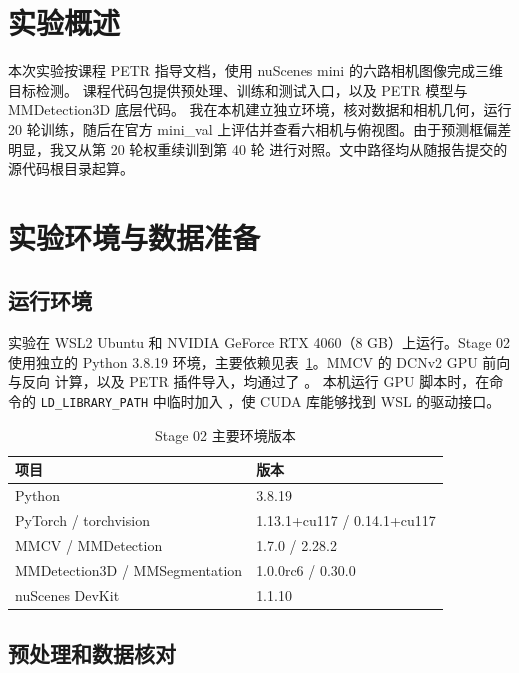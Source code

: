 \documentclass[UTF8,zihao=5,scheme=chinese]{ctexart}
\begin{document}
\makecoursecover
\tableofcontents
\clearpage

\section{实验概述}

本次实验按课程 PETR 指导文档，使用 nuScenes mini 的六路相机图像完成三维目标检测。
课程代码包提供预处理、训练和测试入口，以及 PETR 模型与 MMDetection3D 底层代码。
我在本机建立独立环境，核对数据和相机几何，运行 20 轮训练，随后在官方 mini\_val
上评估并查看六相机与俯视图。由于预测框偏差明显，我又从第 20 轮权重续训到第 40 轮
进行对照。文中路径均从随报告提交的源代码根目录起算。

\section{实验环境与数据准备}

\subsection{运行环境}

实验在 WSL2 Ubuntu 和 NVIDIA GeForce RTX 4060（8 GB）上运行。Stage 02 使用独立的
Python 3.8.19 环境，主要依赖见表~\ref{tab:environment}。MMCV 的 DCNv2 GPU 前向与反向
计算，以及 PETR 插件导入，均通过了 。
本机运行 GPU 脚本时，在命令的 \texttt{LD\_LIBRARY\_PATH} 中临时加入
，使 CUDA 库能够找到 WSL 的驱动接口。

\begin{table}[htbp]
  \centering
  \caption{Stage 02 主要环境版本}
  \label{tab:environment}
  \begin{tabular}{ll}
    \toprule
    项目 & 版本 \\
    \midrule
    Python & 3.8.19 \\
    PyTorch / torchvision & 1.13.1+cu117 / 0.14.1+cu117 \\
    MMCV / MMDetection & 1.7.0 / 2.28.2 \\
    MMDetection3D / MMSegmentation & 1.0.0rc6 / 0.30.0 \\
    nuScenes DevKit & 1.1.10 \\
    \bottomrule
  \end{tabular}
\end{table}

\subsection{预处理和数据核对}
\end{document}
